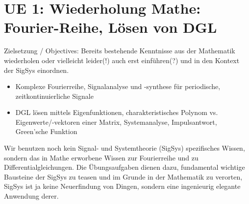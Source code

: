 
\newpage
\section{UE 1: Wiederholung Mathe: Fourier-Reihe, Lösen von DGL}
\label{sec:ue1_intro}
Zielsetzung / Objectives: Bereits bestehende Kenntnisse aus der Mathematik
wiederholen oder vielleicht leider(!) auch erst einführen(?) und in den Kontext der SigSys einordnen.

\begin{itemize}
\item Komplexe Fourierreihe, Signalanalyse und -synthese für periodische, zeitkontinuierliche Signale
\item DGL lösen mittels Eigenfunktionen, charakteristisches Polynom vs. Eigenwerte/-vektoren einer Matrix, Systemanalyse, Impulsantwort, Green'sche Funktion
\end{itemize}
%
Wir benutzen noch kein Signal- und Systemtheorie (SigSys) spezifisches Wissen,
sondern das in Mathe erworbene Wissen zur Fourierreihe
und zu Differentialgleichungen. Die Übungsaufgaben dienen dazu, fundamental
wichtige Bausteine der SigSys zu teasen und im Grunde in der Mathematik zu verorten,
SigSys ist ja keine Neuerfindung von Dingen, sondern eine ingenieurig elegante
Anwendung derer.


\newpage
